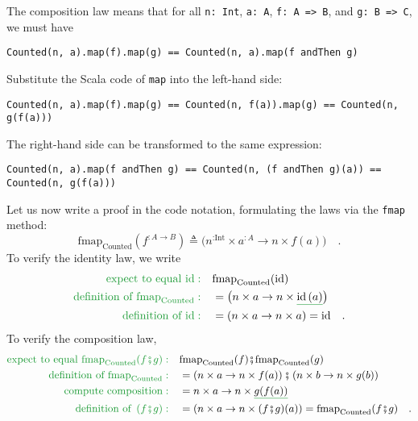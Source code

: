 The composition law means that for all \lstinline!n: Int!, \lstinline!a: A!,
\lstinline!f: A => B!, and \lstinline!g: B => C!, we must have
\begin{lstlisting}
Counted(n, a).map(f).map(g) == Counted(n, a).map(f andThen g)
\end{lstlisting}
Substitute the Scala code of \lstinline!map! into the left-hand side:
\begin{lstlisting}
Counted(n, a).map(f).map(g) == Counted(n, f(a)).map(g) == Counted(n, g(f(a)))
\end{lstlisting}
The right-hand side can be transformed to the same expression:
\begin{lstlisting}
Counted(n, a).map(f andThen g) == Counted(n, (f andThen g)(a)) == Counted(n, g(f(a)))
\end{lstlisting}

Let us now write a proof in the code notation, formulating the laws
via the \lstinline!fmap! method:
\[
\text{fmap}_{\text{Counted}}(f^{:A\rightarrow B})\triangleq\big(n^{:\text{Int}}\times a^{:A}\rightarrow n\times f(a)\big)\quad.
\]
To verify the identity law, we write
\begin{align*}
{\color{greenunder}\text{expect to equal }\text{id}:}\quad & \text{fmap}_{\text{Counted}}(\text{id})\\
{\color{greenunder}\text{definition of }\text{fmap}_{\text{Counted}}:}\quad & =\big(n\times a\rightarrow n\times\gunderline{\text{id}\,(a)}\big)\\
{\color{greenunder}\text{definition of }\text{id}:}\quad & =\left(n\times a\rightarrow n\times a\right)=\text{id}\quad.
\end{align*}
To verify the composition law,
\begin{align*}
{\color{greenunder}\text{expect to equal }\text{fmap}_{\text{Counted}}(f\bef g):}\quad & \text{fmap}_{\text{Counted}}(f)\bef\text{fmap}_{\text{Counted}}(g)\\
{\color{greenunder}\text{definition of }\text{fmap}_{\text{Counted}}:}\quad & =\left(n\times a\rightarrow n\times f(a)\right)\bef\left(n\times b\rightarrow n\times g(b)\right)\\
{\color{greenunder}\text{compute composition}:}\quad & =n\times a\rightarrow n\times\gunderline{g(f(a))}\\
{\color{greenunder}\text{definition of }\left(f\bef g\right):}\quad & =\left(n\times a\rightarrow n\times(f\bef g)(a)\right)=\text{fmap}_{\text{Counted}}(f\bef g)\quad.
\end{align*}

